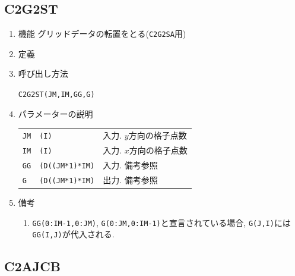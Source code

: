\documentclass[a4j,fleqn]{jarticle}
\begin{document}
\subsection{C2G2ST}

\begin{enumerate}

\item 機能 グリッドデータの転置をとる({\tt C2G2SA}用)

\item 定義

\item 呼び出し方法 

{\tt C2G2ST(JM,IM,GG,G)}

\item パラメーターの説明 
    
\begin{tabular}{lll}
{\tt JM} & {\tt (I)} & 入力. $y$方向の格子点数\\
{\tt IM} & {\tt (I)} & 入力. $x$方向の格子点数\\
{\tt GG}  & {\tt (D((JM*1)*IM)}    & 入力. 備考参照\\
{\tt G} & {\tt (D((JM*1)*IM)} & 出力. 備考参照
\end{tabular}

\item 備考

\begin{enumerate}

 \item {\tt GG(0:IM-1,0:JM)}, {\tt G(0:JM,0:IM-1)}と宣言されている場合,
   {\tt G(J,I)}には{\tt GG(I,J)}が代入される.
   
 \end{enumerate}   

\end{enumerate}   


\subsection{C2AJCB}
\end{document}
